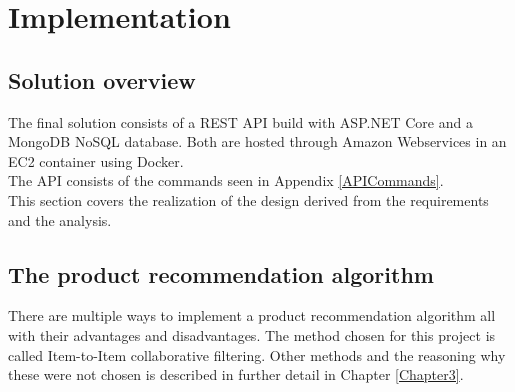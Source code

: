 
\chapter{Implementation} %

\label{Chapter5} %


\section{Solution overview}

The final solution consists of a \gls{REST} API build with ASP.NET Core and a MongoDB \gls{NoSQL} database. Both are hosted through Amazon Webservices in an EC2 container using Docker. \\
The API consists of the commands seen in Appendix \ref{APICommands}. \\

This section covers the realization of the design derived from the requirements and the analysis.

\section{The product recommendation algorithm}
There are multiple ways to implement a product recommendation algorithm all with their advantages and disadvantages. The method chosen for this project is called Item-to-Item collaborative filtering. Other methods and the reasoning why these were not chosen is described in further detail in Chapter \ref{Chapter3}. \\\\

